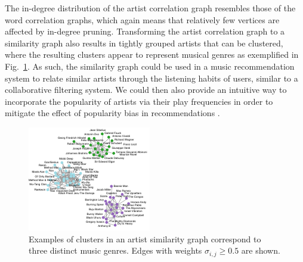 \documentclass[conference]{IEEEtran}
\newcommand{\sy}[1]{\sigma_{#1}}
\begin{document}
The in-degree distribution of the artist correlation graph resembles those of the word correlation graphs,
which again means that relatively few vertices are affected by in-degree pruning. Transforming the artist correlation
graph to a similarity graph also results in tightly grouped artists that can be clustered, where the resulting
clusters appear to represent musical genres as exemplified in Fig.\ \ref{fig:artists}. As such, the similarity graph could
 be used in a music recommendation system to relate similar artists 
through the listening habits of users, similar to a collaborative filtering system. We could then also provide an
 intuitive way to incorporate the popularity of artists via their play frequencies in order to mitigate the 
 effect of popularity bias in recommendations \cite{celma2008hits}.


\begin{figure}
\begin{centering}
\includegraphics[width=0.95\columnwidth]{figures/last-fm-example-3.pdf}
\end{centering}
\caption{Examples of clusters in an artist similarity graph correspond to three distinct music genres. Edges with weights $\sy{i,j} \geq 0.5$ are shown.}
\label{fig:artists}
\end{figure}
\end{document}
